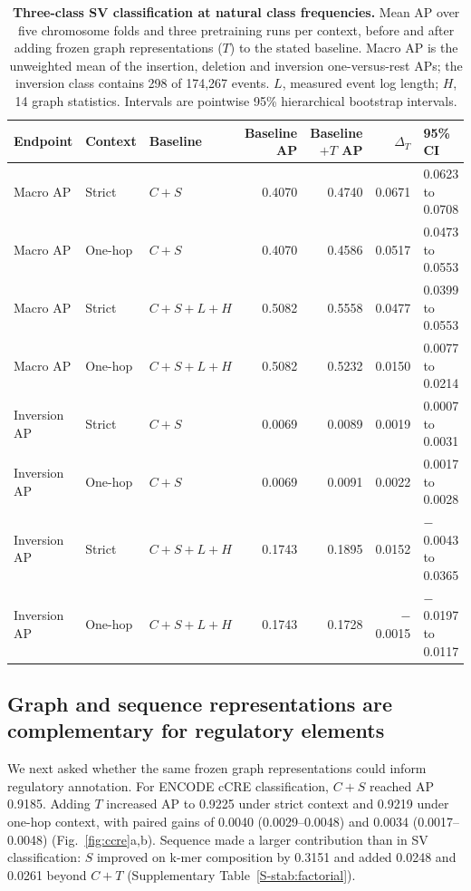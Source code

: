 \documentclass[11pt]{article}
\begin{document}
\begin{bibunit}[unsrtnat]
\begin{table}[tbp]
\centering
\caption{\textbf{Three-class SV classification at natural class frequencies.} Mean AP over five chromosome folds and three pretraining runs per context, before and after adding frozen graph representations ($T$) to the stated baseline. Macro AP is the unweighted mean of the insertion, deletion and inversion one-versus-rest APs; the inversion class contains 298 of 174,267 events. $L$, measured event log length; $H$, 14 graph statistics. Intervals are pointwise 95\% hierarchical bootstrap intervals.}
\label{tab:sv-natural}
\footnotesize
\setlength{\tabcolsep}{4pt}
\begin{tabular}{@{}lllrrrl@{}}
\toprule
Endpoint & Context & Baseline & Baseline AP & Baseline $+T$ AP & $\Delta_T$ & 95\% CI \\
\midrule
Macro AP & Strict & $C+S$ & 0.4070 & 0.4740 & 0.0671 & 0.0623 to 0.0708 \\
Macro AP & One-hop & $C+S$ & 0.4070 & 0.4586 & 0.0517 & 0.0473 to 0.0553 \\
Macro AP & Strict & $C+S+L+H$ & 0.5082 & 0.5558 & 0.0477 & 0.0399 to 0.0553 \\
Macro AP & One-hop & $C+S+L+H$ & 0.5082 & 0.5232 & 0.0150 & 0.0077 to 0.0214 \\
Inversion AP & Strict & $C+S$ & 0.0069 & 0.0089 & 0.0019 & 0.0007 to 0.0031 \\
Inversion AP & One-hop & $C+S$ & 0.0069 & 0.0091 & 0.0022 & 0.0017 to 0.0028 \\
Inversion AP & Strict & $C+S+L+H$ & 0.1743 & 0.1895 & 0.0152 & $-$0.0043 to 0.0365 \\
Inversion AP & One-hop & $C+S+L+H$ & 0.1743 & 0.1728 & $-$0.0015 & $-$0.0197 to 0.0117 \\
\bottomrule
\end{tabular}
\end{table}

\subsection{Graph and sequence representations are complementary for regulatory elements}
\label{sec:ccre-result}

We next asked whether the same frozen graph representations could inform regulatory annotation. For ENCODE cCRE classification\cite{encode2020registry}, $C+S$ reached AP 0.9185. Adding $T$ increased AP to 0.9225 under strict context and 0.9219 under one-hop context, with paired gains of 0.0040 (0.0029--0.0048) and 0.0034 (0.0017--0.0048) (Fig.~\ref{fig:ccre}a,b). Sequence made a larger contribution than in SV classification: $S$ improved on k-mer composition by 0.3151 and added 0.0248 and 0.0261 beyond $C+T$ (Supplementary Table~\ref{S-stab:factorial}).


\end{bibunit}
\end{document}

